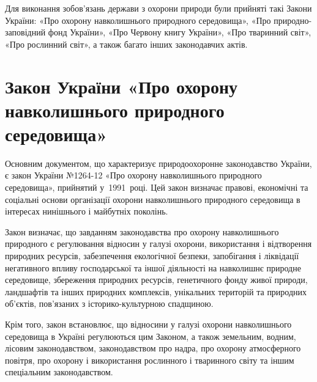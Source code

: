 \documentclass[a4paper,oneside,DIV=10,12pt]{scrreprt}
\begin{document}
		Для виконання зобов'язань держави з охорони природи були прийняті такі Закони України: «Про охорону навколишнього природного середовища», «Про природно-заповідний фонд України», «Про Червону книгу України», «Про тваринний світ», «Про рослинний світ», а також багато інших законодавчих актів. 
		
		\section{Закон України «Про охорону навколишнього природного середовища»}
			Основним документом, що характеризує природоохоронне законодавство України, є закон України №1264-12 «Про охорону навколишнього природного середовища», прийнятий у~1991~році. Цей закон визначає правові, економічні та соціальні основи організації охорони навколишнього природного середовища в інтересах нинішнього і майбутніх поколінь.
			
			Закон визначає, що завданням законодавства про охорону навколишнього природного є регулювання відносин у галузі охорони, використання і відтворення природних ресурсів, забезпечення екологічної безпеки, запобігання і ліквідації негативного впливу господарської та іншої діяльності на навколишнє природне середовище, збереження природних ресурсів, генетичного фонду живої природи, ландшафтів та інших природних комплексів, унікальних територій та природних об'єктів, пов'язаних з історико-культурною спадщиною.
			
			Крім того, закон встановлює, що відносини у галузі охорони навколишнього середовища в Україні регулюються цим Законом, а також земельним, водним, лісовим законодавством, законодавством про надра, про охорону атмосферного повітря, про охорону і використання рослинного і тваринного світу та іншим спеціальним законодавством.
			
\end{document}
